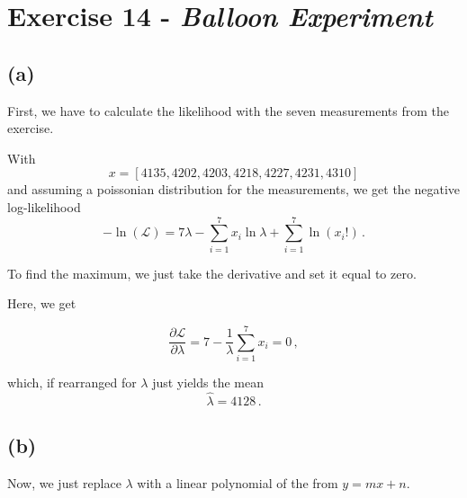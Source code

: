 \section*{Exercise 14 - \textit{Balloon Experiment}}

\subsection*{(a)}

First, we have to calculate the likelihood with the seven
measurements from the exercise.

With
\begin{equation*}
    x = [4135, 4202, 4203, 4218, 4227, 4231, 4310]
\end{equation*}
and assuming a poissonian distribution for the measurements, we get
the negative log-likelihood
\begin{equation*}
    -\ln(\mathscr{L}) = 7\lambda - \sum_{i=1}^7 x_i \ln{\lambda}
    + \sum_{i=1}^7 \ln(x_i!) \,.
\end{equation*}

To find the maximum, we just take the derivative and set it equal to zero.

Here, we get

\begin{equation*}
    \frac{\partial \mathscr{L}}{\partial \lambda} = 7 
    - \frac{1}{\lambda} \sum_{i=1}^7x_i = 0 \,,
\end{equation*}

which, if rearranged for $\lambda$ just yields the mean
\begin{equation*}
    \hat{\lambda} = 4128 \,.
\end{equation*}

\subsection*{(b)}

Now, we just replace $\lambda$ with a linear polynomial of the from
$y = mx + n$.
